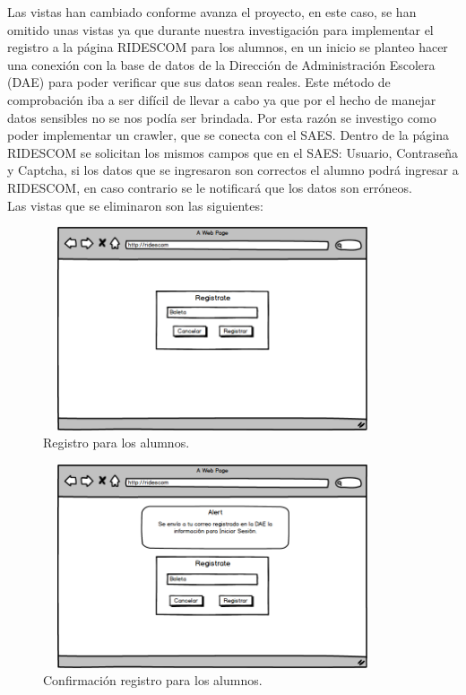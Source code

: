 	\noindent Las vistas han cambiado conforme avanza el proyecto, en este caso, se han omitido unas vistas ya que durante nuestra investigación para implementar el registro a la página RIDESCOM para los alumnos, en un inicio se planteo hacer una conexión con la base de datos de la Dirección de Administración Escolera (DAE) para poder verificar que sus datos sean reales. Este método de comprobación iba a ser difícil de llevar a cabo ya que por el hecho de manejar datos sensibles no se nos podía ser brindada. Por esta razón se investigo como poder implementar un crawler, que se conecta con el SAES. Dentro de la página RIDESCOM se solicitan los mismos campos que en el SAES: Usuario, Contraseña y Captcha, si los datos que se ingresaron son correctos el alumno podrá ingresar a RIDESCOM, en caso contrario se le notificará que los datos son erróneos. \\
	Las vistas que se eliminaron son las siguientes: 
	
	\begin{figure}[hbt!]
		\centering
		\includegraphics[width=10cm, height=6cm]{Imagenes/Disenos/VistasBorradas/p1_Registro.png}
		\caption{Registro para los alumnos.}
	\end{figure}
	
	\begin{figure}[hbt!]
		\centering
		\includegraphics[width=10cm, height=6cm]{Imagenes/Disenos/VistasBorradas/ConfirmacionRegistro.png}
		\caption{Confirmación registro para los alumnos.}
	\end{figure}
	
